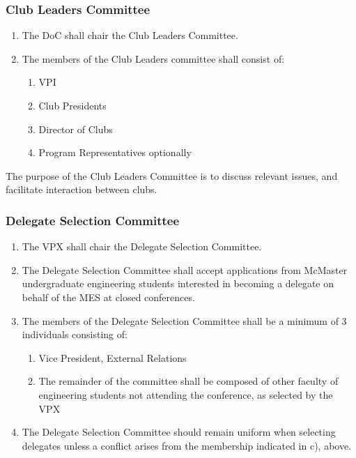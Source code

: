 \subsubsection{Club Leaders Committee}
\label{club-leaders-committee}
\begin{enumerate}
 \item
  The DoC shall chair the Club Leaders Committee.
 \item
  The members of the Club Leaders committee shall consist of:

  \begin{enumerate}
   \item
    VPI
   \item
    Club Presidents
   \item
    Director of Clubs
   \item    
    Program Representatives optionally
  \end{enumerate}
\end{enumerate}

The purpose of the Club Leaders Committee is to discuss relevant issues, and facilitate interaction between clubs.

\subsubsection{Delegate Selection Committee}
\label{delegate-selection-committee}

\begin{enumerate}
 \item
  The VPX shall chair the Delegate Selection Committee.
 \item
  The Delegate Selection Committee shall accept applications from McMaster undergraduate engineering students interested in becoming a delegate on behalf of the MES at closed conferences.
 \item
  The members of the Delegate Selection Committee shall be a minimum of 3 individuals consisting of:

  \begin{enumerate}
   \item
    Vice President, External Relations
   \item
    The remainder of the committee shall be composed of other faculty of engineering students not attending the conference, as selected by the VPX
  \end{enumerate}
 \item
  The Delegate Selection Committee should remain uniform when selecting delegates unless a conflict arises from the membership indicated in c), above.
\end{enumerate}

